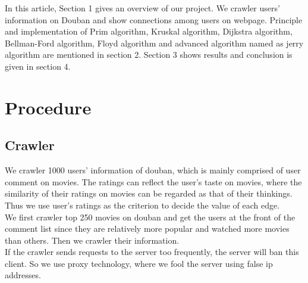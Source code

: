 \documentclass{article}
\begin{document}
In this article, Section 1 gives an overview of our project. We crawler users' information on Douban and show connections among users on webpage. Principle and implementation of Prim algorithm, Kruskal algorithm, Dijkstra algorithm, Bellman-Ford algorithm, Floyd algorithm and advanced algorithm named as jerry algorithm are mentioned in section 2. Section 3 shows results and conclusion is given in section 4. 

\section{Procedure}
\subsection{Crawler}
We crawler 1000 users' information of douban, which is mainly comprised of user comment on movies. The ratings can reflect the user's taste on movies, where the similarity of their ratings on movies can be regarded as that of their thinkings. Thus we use user's ratings as the criterion to decide the value of each edge. \\
We first crawler top 250 movies on douban and get the users at the front of the comment list since they are relatively more popular and watched more movies than others. Then we crawler their information. \\
If the crawler sends requests to the server too frequently, the server will ban this client. So we use proxy technology, where we fool the server using false ip addresses. \\
\end{document}
